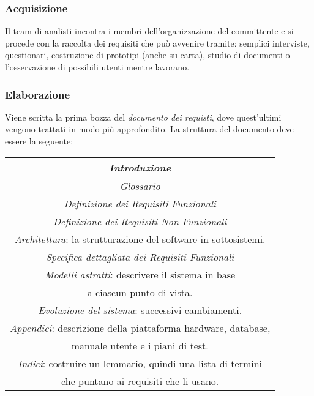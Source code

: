 \subsubsection{Acquisizione}

Il team di analisti incontra i membri dell'organizzazione del committente e si procede con
la raccolta dei requisiti che può avvenire tramite: semplici interviste, questionari, costruzione di
prototipi (anche su carta), studio di documenti o l'osservazione di possibili utenti mentre lavorano.

\subsubsection{Elaborazione}

Viene scritta la prima bozza del \emph{documento dei requisti}, dove quest'ultimi vengono trattati in modo
più approfondito. La struttura del documento deve essere la seguente:

\begin{center}
    \begin{tabular}{||c||}
        \hline
        \emph{Introduzione} \\
        \hline
        \emph{Glossario} \\
        \hline
        \emph{Definizione dei Requisiti Funzionali} \\
        \hline
        \emph{Definizione dei Requisiti Non Funzionali} \\
        \hline
        \emph{Architettura}: la strutturazione del software in sottosistemi. \\
        \hline
        \emph{Specifica dettagliata dei Requisiti Funzionali} \\
        \hline
        \emph{Modelli astratti}: descrivere il sistema in base \\ a ciascun punto di vista. \\
        \hline
        \emph{Evoluzione del sistema}: successivi cambiamenti. \\
        \hline
        \emph{Appendici}: descrizione della piattaforma hardware, database, \\ manuale utente e i piani di test. \\
        \hline
        \emph{Indici}: costruire un lemmario, quindi una lista di termini \\ che puntano ai requisiti che li usano. \\
        \hline
    \end{tabular}
\end{center}

